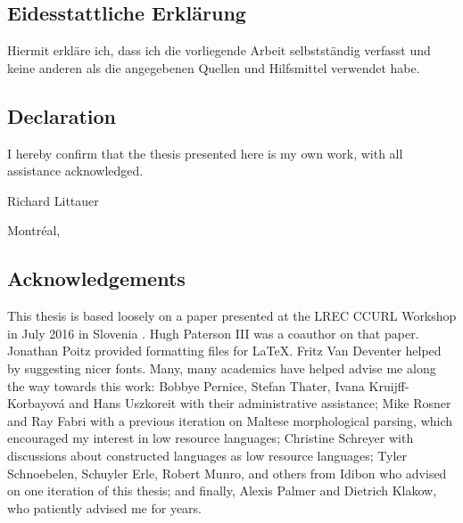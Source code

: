 \documentclass[12pt,a4paper]{article}
\begin{document}


\newpage

\thispagestyle{empty}
\noindent\subsection*{Eidesstattliche Erkl\"arung}

\noindent Hiermit erkl\"are ich, dass ich die vorliegende Arbeit selbstst\"andig verfasst und keine anderen als die angegebenen Quellen und Hilfsmittel verwendet habe.\\

\noindent\subsection*{Declaration}

\noindent I hereby confirm that the thesis presented here is my own work, with all assistance acknowledged. \\

\vspace{1cm}

\noindent Richard Littauer

\vspace{.5cm}

\noindent Montr\'eal, \thedate



\newpage

\thispagestyle{empty}
\noindent\subsection*{Acknowledgements}

\noindent This thesis is based loosely on a paper presented at the LREC CCURL Workshop in July 2016 in Slovenia \citep{CCURL}. Hugh Paterson III was a coauthor on that paper. Jonathan Poitz provided formatting files for \LaTeX. Fritz Van Deventer helped by suggesting nicer fonts. Many, many academics have helped advise me along the way towards this work: Bobbye Pernice, Stefan Thater, Ivana Kruijff-Korbayov\'a and Hans Uszkoreit with their administrative assistance; Mike Rosner and Ray Fabri with a previous iteration on Maltese morphological parsing, which encouraged my interest in low resource languages; Christine Schreyer with discussions about constructed languages as low resource languages; Tyler Schnoebelen, Schuyler Erle, Robert Munro, and others from Idibon who advised on one iteration of this thesis; and finally, Alexis Palmer and Dietrich Klakow, who patiently advised me for years.
\end{document}
